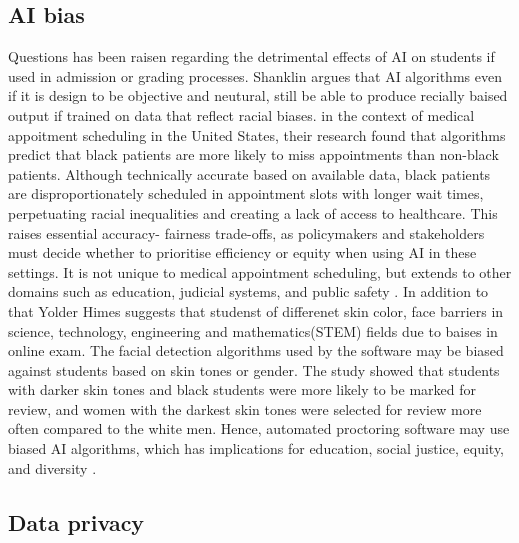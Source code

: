 \subsection{AI bias}
Questions has been raisen regarding the detrimental effects of AI on students if used in admission or grading processes.
Shanklin  argues that AI algorithms even if it is design to be objective and neutural, still be able to produce recially baised 
output if trained on data that reflect racial biases. in the context of medical appoitment scheduling in the United States, 
their research found that algorithms predict that black patients are more likely to miss appointments than non-black patients. 
Although technically accurate based on available data, black patients are disproportionately scheduled in
appointment slots with longer wait times, perpetuating racial inequalities and creating a lack of
access to healthcare. This raises essential accuracy- fairness trade-offs, as policymakers and stakeholders
must decide whether to prioritise efficiency or equity when using AI in these settings. It is not unique to medical appointment scheduling, but
extends to other domains such as education, judicial systems, and public safety \citep{shanklin_ethical_2022}. In addition to that 
Yolder Himes suggests that studenst of differenet skin color, face barriers in
science, technology, engineering and mathematics(STEM) fields due to baises in online exam.
The facial detection algorithms used by the software may be biased against students based on skin tones or gender.
The study showed that students with darker skin tones and black students were more likely to be marked for review, 
and women with the darkest skin tones were selected for review more often compared to the white men. Hence, 
automated proctoring software may use biased AI algorithms, 
which has implications for education, social justice, equity, and diversity \citep{yoder-himes_racial_2022}. 

\subsection{Data privacy}
